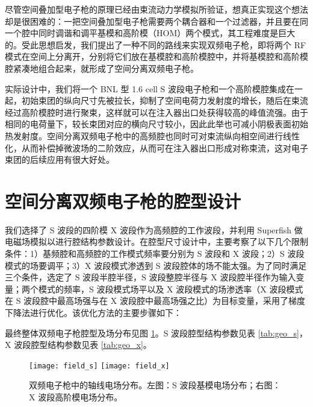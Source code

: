 尽管空间叠加型电子枪的原理已经由束流动力学模拟所验证，想真正实现这个想法却是很困难的：一把空间叠加型电子枪需要两个耦合器和一个过滤器，并且要在同一个腔中同时调谐和调平基模和高阶模（HOM）两个模式，其工程难度是巨大的。受此思想启发，我们提出了一种不同的路线来实现双频电子枪，即将两个 RF 模式在空间上分离开，分别将它们放在基模腔和高阶模腔中，并将基模腔和高阶模腔紧凑地组合起来，就形成了空间分离双频电子枪。

实际设计中，我们将一个 BNL 型 1.6 cell S 波段电子枪和一个高阶模腔集成在一起，初始束团的纵向尺寸先被拉长，抑制了空间电荷力发射度的增长，随后在束流经过高阶模腔时进行聚束，这样就可以在注入器出口处获得较高的峰值流强。由于相同的电荷量下，较长束团对应的横向尺寸较小，因此此举也可减小阴极表面初始热发射度。空间分离双频电子枪中的高频腔也同时可对束流纵向相空间进行线性化，从而补偿掉微波场的二阶效应，从而可在注入器出口形成对称束流，这对电子束团的后续应用有很大好处。

\section{空间分离双频电子枪的腔型设计}
我们选择了 S 波段的四阶模 X 波段作为高频腔的工作波段，并利用 Superfish 做电磁场模拟以进行腔结构参数设计。在腔型尺寸设计中，主要考察了以下几个限制条件：1）基频腔和高频腔的工作模式频率要分别为 S 波段和 X 波段；2）S 波段模式的场要调平；3）X 波段模式渗透到 S 波段腔体的场不能太强。为了同时满足三个条件，选定了 S 波段半腔半径，S 波段整腔半径与 X 波段腔半径作为输入变量；两个模式的频率，S 波段模式场平以及 X 波段模式的场渗透率（X 波段模式在 S 波段腔中最高场强与在 X 波段腔中最高场强之比）为目标变量，采用了梯度下降法进行优化。该优化方法的主要步骤如下：

最终整体双频电子枪腔型及场分布见图 \ref{fig:field_sx}。S 波段腔型结构参数见表 \ref{tab:geo_s}，X 波段腔型结构参数见表 \ref{tab:geo_x}。
\begin{figure}[htbp]
	\centering
	\texttt{[image: field\_s]}
	\texttt{[image: field\_x]}
	\caption{
	双频电子枪中的轴线电场分布。左图：S 波段基模电场分布；右图：X 波段高阶模电场分布。}
	\label{fig:field_sx}
\end{figure}


